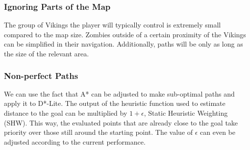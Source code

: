 \subsubsection{Ignoring Parts of the Map}
The group of Vikings the player will typically control is extremely small compared to the map size. Zombies outside of a certain proximity of the Vikings can be simplified in their navigation. Additionally, paths will be only as long as the size of the relevant area.

\subsubsection{Non-perfect Paths}
We can use the fact that A* can be adjusted to make sub-optimal paths and apply it to D*-Lite. The output of the heuristic function used to estimate distance to the goal can be multiplied by $1 + \epsilon$, Static Heuristic Weighting (SHW). This way, the evaluated points that are already close to the goal take priority over those still around the starting point. The value of $\epsilon$ can even be adjusted according to the current performance.